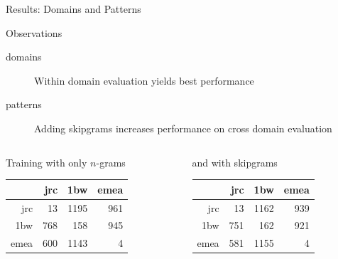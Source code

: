 \begin{frame}{Results: Domains and Patterns}

    \begin{block}{Observations}
        \begin{description}
            \item[domains] Within domain evaluation yields best performance
            \item[patterns] Adding skipgrams increases performance on cross domain evaluation
        \end{description}
    \end{block}

    {\small
        \begin{columns}[T,totalwidth=\textwidth]
            \begin{column}{0.5\textwidth}
                \begin{block}{Training with only $n$-grams}
                    \begin{tabular}{rrrr}
                            & jrc & 1bw  & emea \\ \hline
                        jrc & 13  & 1195 & 961 \\
                        1bw & 768 & 158  & 945 \\
                        emea& 600 & 1143 & 4
                    \end{tabular}
                \end{block}
            \end{column}
            \begin{column}{0.5\textwidth}
                \begin{block}{and with skipgrams}
                    \begin{tabular}{rrrr}
                            & jrc & 1bw  & emea \\ \hline
                        jrc & 13  & 1162 & 939 \\
                        1bw & 751 & 162  & 921 \\
                        emea& 581 & 1155 & 4
                    \end{tabular}
                \end{block}
            \end{column}
        \end{columns}
        \hspace{1em}
}
\end{frame}
